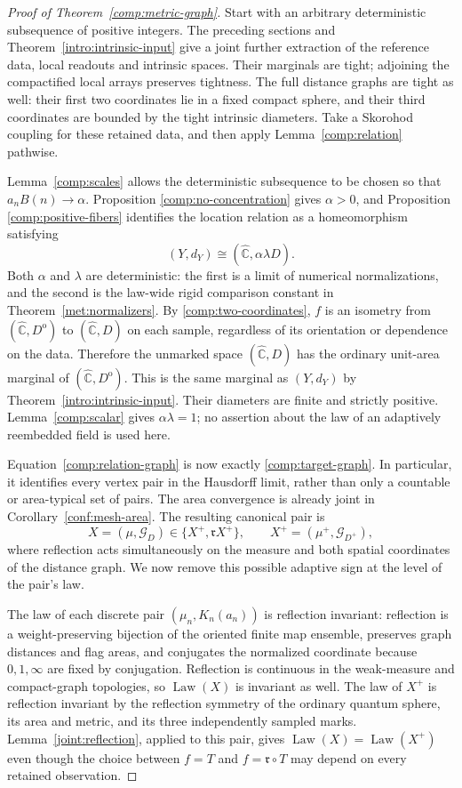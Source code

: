 \documentclass[11pt]{article}
\numberwithin{equation}{section}
\theoremstyle{definition}
\theoremstyle{remark}
\newcommand{\1}{\mathbf 1}
\begin{document}
\begin{proof}[Proof of Theorem~\ref{comp:metric-graph}]
Start with an arbitrary deterministic subsequence of positive
integers.  The preceding sections and
Theorem~\ref{intro:intrinsic-input} give a joint further extraction
of the reference data, local readouts and intrinsic spaces.
Their marginals are tight; adjoining the compactified local
arrays preserves tightness.  The full distance graphs are tight
as well: their first two coordinates lie in a fixed compact
sphere, and their third coordinates are bounded by the tight
intrinsic diameters.  Take a Skorohod coupling for these retained
data, and then apply Lemma~\ref{comp:relation} pathwise.

Lemma~\ref{comp:scales} allows the deterministic subsequence to
be chosen so that $a_nB(n)\to\alpha$.  Proposition
\ref{comp:no-concentration} gives $\alpha>0$, and Proposition
\ref{comp:positive-fibers} identifies the location relation as a
homeomorphism satisfying
\[
 (Y,d_Y)\cong(\widehat{\mathbb C},\alpha\lambda D).
\]
Both $\alpha$ and $\lambda$ are deterministic: the first is a
limit of numerical normalizations, and the second is the
law-wide rigid comparison constant in
Theorem~\ref{met:normalizers}.  By
\eqref{comp:two-coordinates}, $f$ is an isometry from
$(\widehat{\mathbb C},D^{\mathrm o})$ to $(\widehat{\mathbb C},D)$ on each sample, regardless
of its orientation or dependence on the data.  Therefore the
unmarked space $(\widehat{\mathbb C},D)$ has the ordinary unit-area marginal
of $(\widehat{\mathbb C},D^{\mathrm o})$.  This is the same marginal as
$(Y,d_Y)$ by Theorem~\ref{intro:intrinsic-input}.  Their diameters
are finite and strictly positive.  Lemma~\ref{comp:scalar}
gives $\alpha\lambda=1$; no assertion about the law of an
adaptively reembedded field is used here.

Equation~\eqref{comp:relation-graph} is now exactly
\eqref{comp:target-graph}.  In particular, it identifies every
vertex pair in the Hausdorff limit, rather than only a countable
or area-typical set of pairs.  The area convergence is already
joint in Corollary~\ref{conf:mesh-area}.  The resulting canonical
pair is
\[
 X=(\mu,\mathcal G_D)
   \in\{X^+,\mathfrak r X^+\},\qquad
 X^+=(\mu^+,\mathcal G_{D^+}),
\]
where reflection acts simultaneously on the measure and both
spatial coordinates of the distance graph.  We now remove this
possible adaptive sign at the level of the pair's law.

The law of each discrete pair $(\mu_n,K_n(a_n))$ is reflection
invariant: reflection is a weight-preserving bijection of the
oriented finite map ensemble, preserves graph distances and
flag areas, and conjugates the normalized coordinate because
$0,1,\infty$ are fixed by conjugation.  Reflection is continuous
in the weak-measure and compact-graph topologies, so $\operatorname{Law}(X)$
is invariant as well.  The law of $X^+$ is reflection invariant
by the reflection symmetry of the ordinary quantum sphere,
its area and metric, and its three independently sampled marks.
Lemma~\ref{joint:reflection}, applied to this pair, gives
$\operatorname{Law}(X)=\operatorname{Law}(X^+)$ even though the choice between $f=T$ and
$f=\mathfrak r\circ T$ may depend on every retained observation.


\end{proof}
\end{document}
